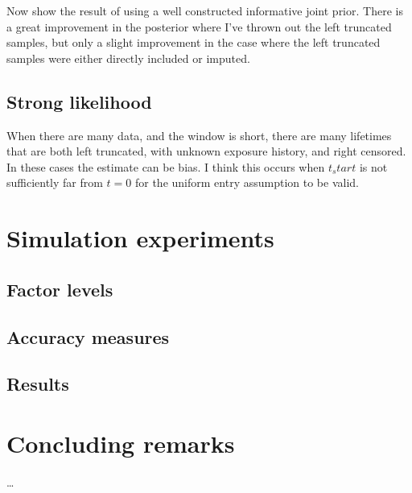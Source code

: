 Now show the result of using a well constructed informative joint prior. There is a great improvement in the posterior where I've thrown out the left truncated samples, but only a slight improvement in the case where the left truncated samples were either directly included or imputed.

\subsection{Strong likelihood}

When there are many data, and the window is short, there are many lifetimes that are both left truncated, with unknown exposure history, and right censored. In these cases the estimate can be bias. I think this occurs when $t_start$ is not sufficiently far from $t = 0$ for the uniform entry assumption to be valid.

\section{Simulation experiments}

\subsection{Factor levels}

\subsection{Accuracy measures}

\subsection{Results}

\section{Concluding remarks}

\ldots